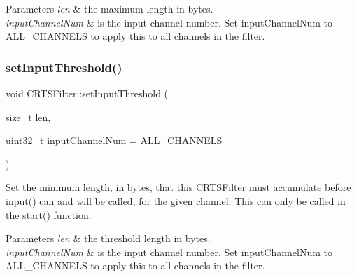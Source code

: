 \begin{DoxyParams}{Parameters}
{\em len} & the maximum length in bytes.\\
\hline
{\em input\+Channel\+Num} & is the input channel number. Set {\ttfamily input\+Channel\+Num} to {\ttfamily A\+L\+L\+\_\+\+C\+H\+A\+N\+N\+E\+LS} to apply this to all channels in the filter. \\
\hline
\end{DoxyParams}
\mbox{\label{classCRTSFilter_a4d221e7b871d483f68c73c379fd08cd3}} 
\subsubsection{\texorpdfstring{set\+Input\+Threshold()}{setInputThreshold()}}
{\footnotesize\ttfamily void C\+R\+T\+S\+Filter\+::set\+Input\+Threshold (\begin{DoxyParamCaption}\item[{size\+\_\+t}]{len,  }\item[{uint32\+\_\+t}]{input\+Channel\+Num = {\ttfamily \hyperlink{classCRTSFilter_a9ea354654e8e2e8ce3bff293cc35fafe}{A\+L\+L\+\_\+\+C\+H\+A\+N\+N\+E\+LS}} }\end{DoxyParamCaption})\hspace{0.3cm}{\ttfamily [protected]}}

Set the minimum length, in bytes, that this \hyperlink{classCRTSFilter}{C\+R\+T\+S\+Filter} must accumulate before \hyperlink{classCRTSFilter_ab75eb3db5914c0d6b3781439d46b2301}{input()} can and will be called, for the given channel. This can only be called in the \hyperlink{classCRTSFilter_a15a3e99b38a67fd40559776d468b95fa}{start()} function.


\begin{DoxyParams}{Parameters}
{\em len} & the threshold length in bytes.\\
\hline
{\em input\+Channel\+Num} & is the input channel number. Set {\ttfamily input\+Channel\+Num} to {\ttfamily A\+L\+L\+\_\+\+C\+H\+A\+N\+N\+E\+LS} to apply this to all channels in the filter. \\
\hline
\end{DoxyParams}
\mbox{\label{classCRTSFilter_aa484e49c5a75c467209324930bc1a0bf}} 
